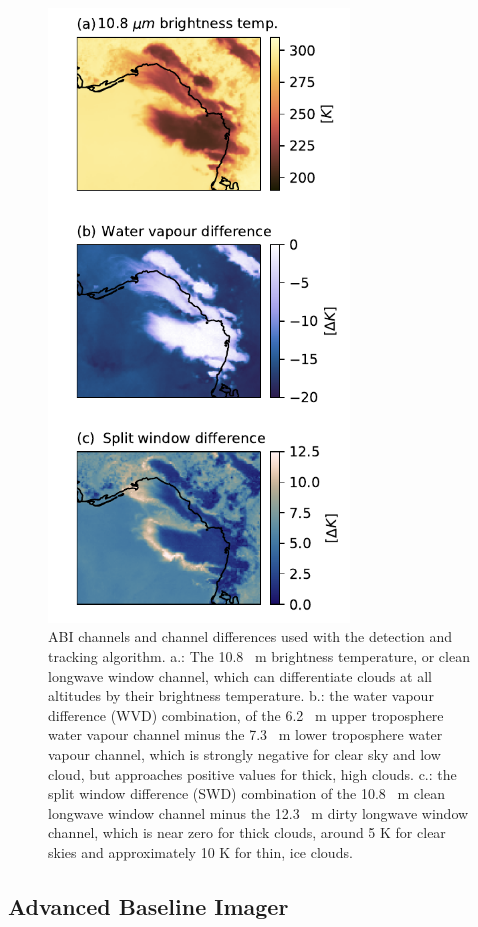 \documentclass[amt, manuscript]{copernicus}
\begin{document}
\begin{figure}[t]
    \includegraphics[width=8cm]{figure03.pdf}
    \caption{ABI channels and channel differences used with the detection and tracking algorithm. a.: The 10.8 \unit{\mu m} brightness temperature, or clean longwave window channel, which can differentiate clouds at all altitudes by their brightness temperature. b.: the water vapour difference (WVD) combination, of the 6.2 \unit{\mu m} upper troposphere water vapour channel minus the 7.3 \unit{\mu m} lower troposphere water vapour channel, which is strongly negative for clear sky and low cloud, but approaches positive values for thick, high clouds. c.: the split window difference (SWD) combination of the 10.8 \unit{\mu m} clean longwave window channel minus the 12.3 \unit{\mu m} dirty longwave window channel, which is near zero for thick clouds, around 5 \unit{K} for clear skies and approximately 10 \unit{K} for thin, ice clouds.}
    \label{fig:abi_channels}
\end{figure}

\subsection{Advanced Baseline Imager}
\end{document}

